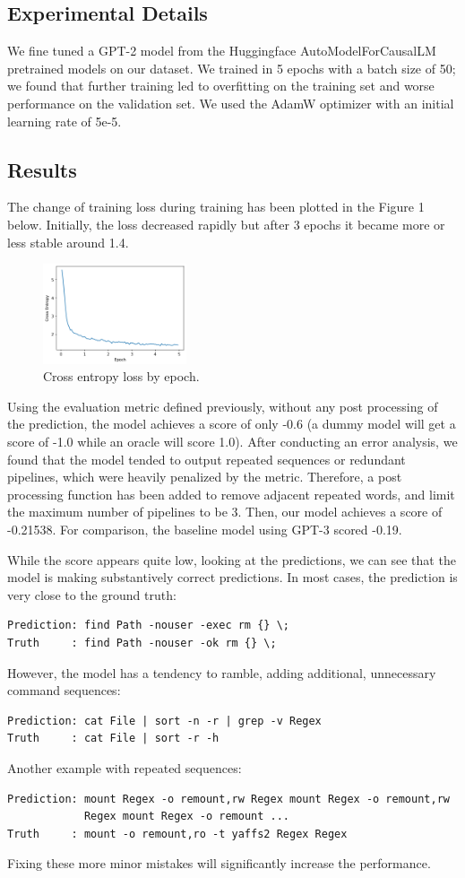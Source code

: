 \subsection{Experimental Details}
We fine tuned a GPT-2 model from the Huggingface AutoModelForCausalLM
pretrained models on our dataset. We trained in 5 epochs with a batch size of
50; we found that further training led to overfitting on the training set and
worse performance on the validation set. We used the AdamW optimizer with an
initial learning rate of 5e-5.

\subsection{Results}
The change of training loss during training has been plotted in the Figure 1
below. Initially, the loss decreased rapidly but after 3 epochs it became more
or less stable around 1.4.

\begin{figure}[ht!]
	\centering
	\includegraphics[width = 160px]{training_loss.png}
	\caption{Cross entropy loss by epoch.}
	\label{overfitting}
\end{figure}
\par
Using the evaluation metric defined previously, without any post processing of
the prediction, the model achieves a score of only -0.6 (a dummy model will get
a score of -1.0 while an oracle will score 1.0). After conducting an error
analysis, we found that the model tended to output repeated sequences or
redundant pipelines, which were heavily penalized by the metric. Therefore, a
post processing function has been added to remove adjacent repeated words, and
limit the maximum number of pipelines to be 3. Then, our model achieves a score
of -0.21538. For comparison, the baseline model using GPT-3 scored -0.19.
\par
While the score appears quite low, looking at the predictions, we can see that
the model is making substantively correct predictions. In most cases, the
prediction is very close to the ground truth:
\begin{verbatim}
Prediction: find Path -nouser -exec rm {} \;
Truth     : find Path -nouser -ok rm {} \; 
\end{verbatim}
However, the model has a tendency to ramble, adding additional, unnecessary command sequences:
\begin{verbatim}
Prediction: cat File | sort -n -r | grep -v Regex
Truth     : cat File | sort -r -h 
\end{verbatim}
Another example with repeated sequences:
\begin{verbatim}
Prediction: mount Regex -o remount,rw Regex mount Regex -o remount,rw 
            Regex mount Regex -o remount ...
Truth     : mount -o remount,ro -t yaffs2 Regex Regex 
\end{verbatim}
Fixing these more minor mistakes will significantly increase the performance.

